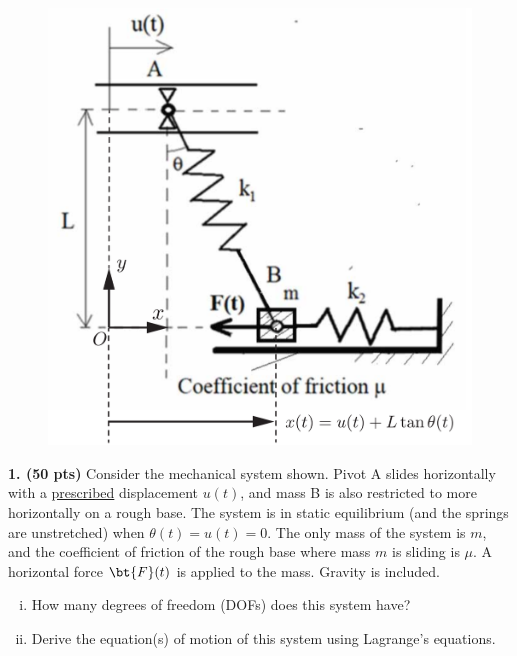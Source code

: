 \pagestyle{fancy}
\setlength{\headheight}{16pt}
\fancyhead{} %
\fancyfoot{} %
\fancyfoot[C]{\thepage}

\begin{problem}
    \begin{figure}
        \vspace{-0.35cm}
        \centering
        \includegraphics[width=0.8\linewidth]{homework/hw1/assets/hw1_p1_annotated.pdf}
    \end{figure}
    \textbf{1. (50 pts)} Consider the mechanical system shown. 
    Pivot A slides horizontally with a \ul{prescribed} displacement $u(t)$, and mass B is also restricted to more horizontally on a rough base. 
    The system is in static equilibrium (and the springs are unstretched) when $\theta(t) = u(t) = 0$. 
    The only mass of the system is $m$, and the coefficient of friction of the rough base where mass $m$ is sliding is $\mu$. 
    A horizontal force $\bt{F}(t)$ is applied to the mass. 
    Gravity is included.
    \begin{enumerate}[(i)]
        \item {
            How many degrees of freedom (DOFs) does this system have?
        }
        \item {
            Derive the equation(s) of motion of this system using Lagrange's equations.
        }
    \end{enumerate}
\end{problem}

